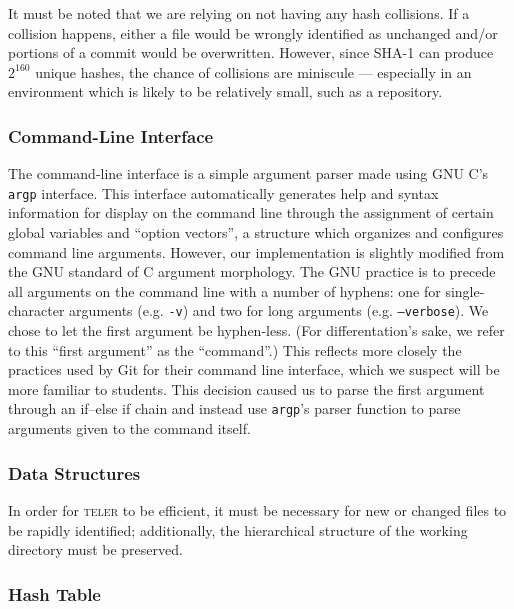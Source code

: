 \documentclass[12pt, letterpaper]{article}
\begin{document}
\begin{multicols}{2}
  It must be noted that we are relying on not having any
  hash collisions. If a collision happens, either a file would be
  wrongly identified as unchanged and/or portions of a commit would be
  overwritten. However, since SHA-1 can produce $2^{160}$ unique
  hashes, the chance of collisions are miniscule --- especially in an
  environment which is likely to be relatively small, such as a
  repository.

  \subsubsection{Command-Line Interface}
  \label{subsec:cli}

  The command-line interface is a simple argument parser made using
  GNU C's \texttt{argp} interface. This interface automatically
  generates help and syntax information for display on the command
  line through the assignment of certain global variables and ``option
  vectors'', a structure which organizes and configures command line
  arguments. However, our implementation is slightly modified from the
  GNU standard of C argument morphology. The GNU practice is to
  precede all arguments on the command line with a number of hyphens:
  one for single-character arguments (e.g. \texttt{-v}) and two for
  long arguments (e.g. \texttt{--verbose}). We chose to let the first
  argument be hyphen-less. (For differentation's sake, we refer to
  this ``first argument'' as the ``command''.) This reflects more
  closely the practices used by Git for their command line interface,
  which we suspect will be more familiar to students. This decision
  caused us to parse the first argument through an if--else if chain
  and instead use \texttt{argp}'s parser function to parse arguments
  given to the command itself.

  \subsubsection{Data Structures}
  \label{subsec:datastructures}
  In order for \textsc{teler} to be efficient, it must be necessary for
  new or changed files to be rapidly identified; additionally,
  the hierarchical structure of the working directory must be preserved.

  \subsubsection{Hash Table}
  \label{subsubsec:hashtable}


\end{multicols}
\end{document}
